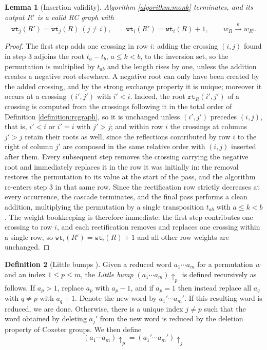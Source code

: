 \documentclass{amsart}
\newtheorem{lemma}{Lemma}[subsection]
\theoremstyle{definition}
\newtheorem{definition}[lemma]{Definition}
\theoremstyle{remark}
\numberwithin{equation}{subsection}
\newcommand{\wof}[1]{w_{#1}}
\newcommand{\wtt}{\mathtt{wt}}
\newcommand{\tom}[1]{\xrightarrow{#1}}
\newcommand{\rtt}{\mathtt{rt}}
\newcommand{\ltb}[2]{#1\!\uparrow_{#2}}
\begin{document}
\begin{lemma}[Insertion validity]\label{lemma:insertworks}
Algorithm \ref{algorithm:monk} terminates, and its output $R'$ is a valid RC graph with
$$\wtt_j(R')=\wtt_j(R)\ (j\neq i),\qquad \wtt_i(R')=\wtt_i(R)+1,\qquad \wof{R}\tom{k}\wof{R'}.$$
\end{lemma}
\begin{proof}
The first step adds one crossing in row $i$: adding the crossing $(i,j)$ found in step 3 adjoins the root $t_a-t_b$, $a\leq k<b$, to the inversion set, so the permutation is multiplied by $t_{ab}$ and the length rises by one, unless the addition creates a negative root elsewhere. A negative root can only have been created by the added crossing, and by the strong exchange property it is unique; moreover it occurs at a crossing $(i',j')$ with $i'<i$. Indeed, the root $\rtt_R(i',j')$ of a crossing is computed from the crossings following it in the total order of Definition \ref{definition:rcgraph}, so it is unchanged unless $(i',j')$ precedes $(i,j)$, that is, $i'<i$ or $i'=i$ with $j'>j$; and within row $i$ the crossings at columns $j'>j$ retain their roots as well, since the reflections contributed by row $i$ to the right of column $j'$ are composed in the same relative order with $(i,j)$ inserted after them. Every subsequent step removes the crossing carrying the negative root and immediately replaces it in the row it was initially in: the removal restores the permutation to its value at the start of the pass, and the algorithm re-enters step 3 in that same row. Since the rectification row strictly decreases at every occurrence, the cascade terminates, and the final pass performs a clean addition, multiplying the permutation by a single transposition $t_{ab}$ with $a\leq k<b$. The weight bookkeeping is therefore immediate: the first step contributes one crossing to row $i$, and each rectification removes and replaces one crossing within a single row, so $\wtt_i(R')=\wtt_i(R)+1$ and all other row weights are unchanged.
\end{proof}

\begin{definition}[Little bumps {\cite{little2003combinatorial}}]\label{definition:littlebump}
  Given a reduced word $a_1\cdots a_m$ for a permutation $w$ and an index $1\leq p\leq m$, the \emph{Little bump} $\ltb{(a_1\cdots a_m)}{p}$ is defined recursively as follows. If $a_p>1$, replace $a_p$ with $a_p-1$, and if $a_p=1$ then instead replace all $a_q$ with $q\neq p$ with $a_q+1$. Denote the new word by $a_1'\cdots a_m'$. If this resulting word is reduced, we are done. Otherwise, there is a unique index $j\neq p$ such that the word obtained by deleting $a_j'$ from the new word is reduced by the deletion property of Coxeter groups. We then define
  $$\ltb{(a_1\cdots a_m)}{p} = \ltb{(a_1'\cdots a_m')}{j}$$
\end{definition}
\end{document}
